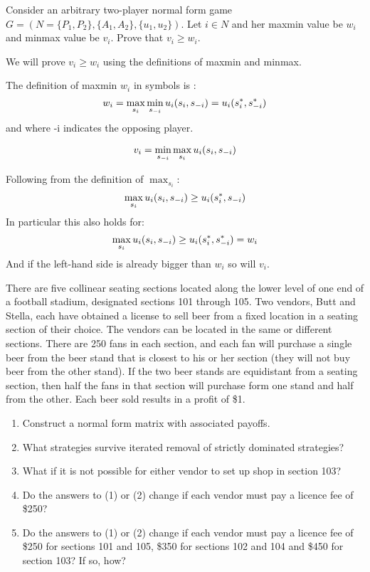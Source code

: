 \documentclass[../main.tex]{subfiles}
\begin{document}
\begin{question}
	Consider an arbitrary two-player normal form game $G = (N=\{P_1,P_2\},\{A_1,A_2\},\{u_1,u_2\})$.
	Let $i \in N$ and her maxmin value be $w_i$ and minmax value be $v_i$. Prove that $v_i \geq w_i$.
\end{question}

\begin{solution}
	We will prove $v_i \geq w_i$ using the definitions of maxmin and minmax.

	\noindent The definition of maxmin $w_i$ in symbols is :
	\begin{equation}
		w_i = \max_{s_i} \min_{s_{\--i}} u_i(s_i,s_{\--i}) = u_i(s_{i}^{*},s_{-i}^{*})
	\end{equation}
	\noindent and where \--i indicates the opposing player.

	$$v_i = \min_{s_{\--i}} \max_{s_i} u_i(s_i,s_{\--i})$$

	\noindent Following from the definition of $\max_{s_i}$:
	$$\max_{s_i} u_i(s_i,s_{\--i}) \geq u_i(s_i^{*}, s_{\--i})$$
	\noindent In particular this also holds for:
	$$\max_{s_i} u_i(s_i,s_{\--i}) \geq u_i(s_i^{*},s_{\--i}^{*}) = w_i$$
	\noindent And if the left-hand side is already bigger than $w_i$ so will $v_i$.
\end{solution}

\begin{question}

There are five collinear seating sections located along the lower level of one end of a football stadium, designated sections 101 through 105. Two vendors, Butt and Stella, each have obtained a license to sell beer from a fixed location in a seating section of their choice. The vendors can be located in the same or different sections. There are 250 fans in each section, and each fan will purchase a single beer from the beer stand that is closest to his or her section (they will not buy beer from the other stand). If the two beer stands are
equidistant from a seating section, then half the fans in that section will purchase form one stand and half from the other. Each beer sold results in a profit of \$1.

	\begin{enumerate}
		\item Construct a normal form matrix with associated payoffs.
		\item What strategies survive iterated removal of strictly dominated strategies?
		\item What if it is not possible for either vendor to set up shop in section 103?
		\item Do the answers to (1) or (2) change if each vendor must pay a licence fee of \$250?
		\item Do the answers to (1) or (2) change if each vendor must pay a licence fee of \$250 for sections 101 and 105, \$350 for sections 102 and 104 and \$450 for section 103? If so, how?
	\end{enumerate}

\end{question}
\end{document}
